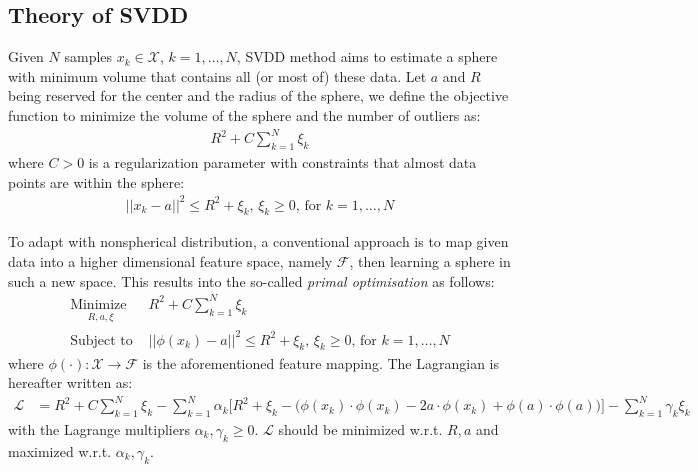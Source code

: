 \documentclass[3p]{elsarticle}
\theoremstyle{problemstyle}
\begin{document}
\subsection{Theory of SVDD}

Given $N$ samples $x_k \in \mathcal{X}$, $k=1,\dots,N$, SVDD method aims to estimate a sphere with minimum volume that contains all (or most of) these data. Let $a$ and $R$ being reserved for the center and the radius of the sphere, we define the objective function to minimize the volume of the sphere and the number of outliers as:
\begin{align}
R^2 + C \sum_{k=1}^N \xi_k
\end{align}
where $C > 0$ is a regularization parameter with constraints that almost data points are within the sphere:
\begin{align}
\left|\left| x_k - a \right|\right|^2 \le R^2 + \xi_k \text{, } \xi_k \ge 0 \text{, for } k=1,\dots,N
\end{align}

To adapt with nonspherical distribution, a conventional approach is to map given data into a higher dimensional feature space, namely $\mathcal{F}$, then learning a sphere in such a new space. This results into the so-called \emph{primal optimisation} as follows:
\begin{subequations}\label{eq:svm_primal}
\begin{align}
\underset{
	\begin{array}{c}
		 R, a, \xi
	\end{array}}{\text{Minimize }} &R^2 + C \sum_{k=1}^N \xi_k \\
\text{Subject to } &\left|\left| \phi \left( x_k \right) - a \right|\right|^2 \le R^2 + \xi_k \text{, } \xi_k \ge 0 \text{, for } k=1,\dots,N
\end{align}
\end{subequations}
where $\phi \left( \cdot \right): \mathcal{X} \to \mathcal{F}$ is the aforementioned feature mapping. The Lagrangian is hereafter written as:
\begin{align}
\mathcal{L} &= R^2 + C \sum_{k=1}^N \xi_k - \sum_{k=1}^N \alpha_k \bigg[ R^2 + \xi_k - \bigg( \phi \left( x_k \right) \cdot \phi \left( x_k \right) - 2 a \cdot \phi \left( x_k \right) + \phi \left( a \right) \cdot \phi \left( a \right) \bigg) \bigg] - \sum_{k=1}^N \gamma_k \xi_k \label{eq:svm_lagrange_init}
\end{align}
with the Lagrange multipliers $\alpha_k, \gamma_k \ge 0$. $\mathcal{L}$ should be minimized w.r.t. $R, a$ and maximized w.r.t. $\alpha_k, \gamma_k$.
\end{document}
